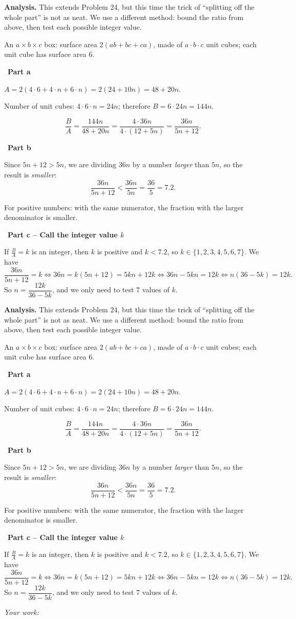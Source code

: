 \documentclass[11pt]{article}
\newif\ifsol \soltrue
\newcommand{\probsol}[1]{%
  \begin{lrbox}{\solmeasure}\begin{minipage}{\dimexpr\linewidth-24pt\relax}#1\end{minipage}\end{lrbox}%
  \ifsol
    \begin{solbox}#1\end{solbox}%
  \else
    \setlength{\solht}{\dimexpr\ht\solmeasure+\dp\solmeasure+0.85cm\relax}%
    \ifdim\solht<1.35cm\setlength{\solht}{1.35cm}\fi
    \ifdim\solht>\StudentMaxWork\setlength{\solht}{\StudentMaxWork}\fi
    \begin{tcolorbox}[colback=white,colframe=Line,boxrule=0.8pt,arc=5pt,
      left=8pt,right=8pt,top=4pt,bottom=4pt,height=\solht]{\footnotesize\color{Slate}\itshape\WorkWord}\end{tcolorbox}%
  \fi}
\newlength{\StudentMaxWork}\setlength{\StudentMaxWork}{7.5cm}
\newcommand{\step}[2]{\par\smallskip\noindent{\bfseries\color{tmBlue!85!black}\StepWord~#1.}\ {\bfseries #2}\par\nopagebreak}
\def\WorkWord{Your work:}
\def\StepWord{Step}
\begin{document}
\probsol{
\textbf{Analysis.} This extends Problem 24, but this time the trick of ``splitting off the whole part'' is not as neat. We use a different method: bound the ratio from above, then test each possible integer value.
\begin{recallbox}An $a\times b\times c$ box: surface area $2(ab+bc+ca)$, made of $a\cdot b\cdot c$ unit cubes; each unit cube has surface area $6$.\end{recallbox}

\step{1}{Part a}
$A=2(4\cdot 6+4\cdot n+6\cdot n)=2(24+10n)=48+20n$.\par
Number of unit cubes: $4\cdot 6\cdot n=24n$; therefore $B=6\cdot 24n=144n$.\par
\[ \frac{B}{A}=\frac{144n}{48+20n}=\frac{4\cdot 36n}{4\cdot(12+5n)}=\frac{36n}{5n+12}. \]

\step{2}{Part b}
Since $5n+12>5n$, we are dividing $36n$ by a number \emph{larger} than $5n$, so the result is \emph{smaller}:
\[ \frac{36n}{5n+12}<\frac{36n}{5n}=\frac{36}{5}=7.2. \]
\begin{recallbox}For positive numbers: with the same numerator, the fraction with the larger denominator is smaller.\end{recallbox}

\step{3}{Part c -- Call the integer value $k$}
If $\frac{B}{A}=k$ is an integer, then $k$ is positive and $k<7.2$, so $k\in\{1,2,3,4,5,6,7\}$. We have
\[ \frac{36n}{5n+12}=k \iff 36n=k(5n+12)=5kn+12k \iff 36n-5kn=12k \iff n(36-5k)=12k. \]
So $n=\dfrac{12k}{36-5k}$, and we only need to test $7$ values of $k$.

}
\end{document}
